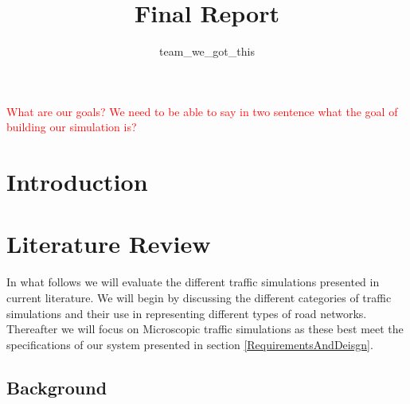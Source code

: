 \documentclass{article}
\begin{document}
	
	
	\title{Final Report}
	\author{team\_we\_got\_this}
	\maketitle
	\thispagestyle{plain}
	\graphicspath{ {Images/} }
	
	\tableofcontents
	\listoffigures
	\listoftables
	\vspace{2cm}
	\textcolor{red}{What are our goals? We need to be able to say in two sentence what the goal of building our simulation is? }
	
	\pagebreak
	\section*{Introduction}
	
	\section{Literature Review}
	
	\noindent
	In what follows we will evaluate the different traffic simulations presented in current literature. 
	We will begin by discussing the different categories of traffic simulations and their use in representing different types of road networks. 
	Thereafter we will focus on Microscopic traffic simulations as these best meet the specifications of our system presented in section \ref{RequirementsAndDeisgn}.
	
	\subsection{Background}
	
\end{document}
